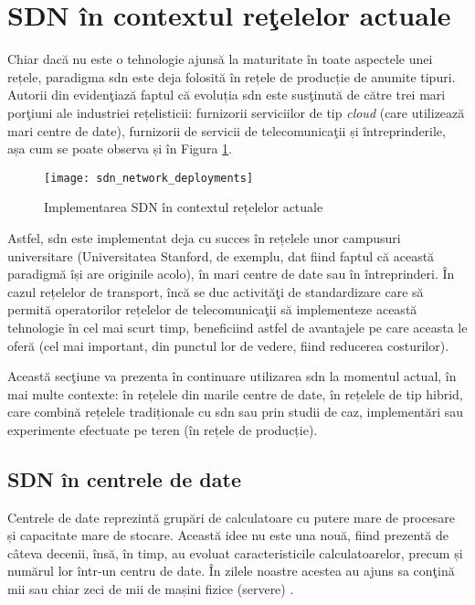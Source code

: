 \section{SDN în contextul reţelelor actuale}

Chiar dacă nu este o tehnologie ajunsă la maturitate în toate aspectele unei rețele, paradigma \gls{sdn} este deja folosită în rețele de producție de anumite tipuri. Autorii din \cite{alvizu2017comprehensive} evidenţiază faptul că evoluția \gls{sdn} este susţinută de către trei mari porţiuni ale industriei rețelisticii: furnizorii serviciilor de tip \textit{cloud} (care utilizează mari centre de date), furnizorii de servicii de telecomunicaţii și întreprinderile, așa cum se poate observa și în Figura \ref{fig:sdn_network_deployments}. 

\begin{figure}[h]
	\centering
	\texttt{[image: sdn\_network\_deployments]}
	\caption{Implementarea SDN în contextul rețelelor actuale~\cite{alvizu2017comprehensive}}
	\label{fig:sdn_network_deployments}
\end{figure}

Astfel, \gls{sdn} este implementat deja cu succes în rețelele unor campusuri universitare (Universitatea Stanford, de exemplu, dat fiind faptul că această paradigmă își are originile acolo), în mari centre de date sau în întreprinderi. În cazul rețelelor de transport, încă se duc activităţi de standardizare care să permită operatorilor rețelelor de telecomunicaţii să implementeze această tehnologie în cel mai scurt timp, beneficiind astfel de avantajele pe care aceasta le oferă (cel mai important, din punctul lor de vedere, fiind reducerea costurilor).

Această secţiune va prezenta în continuare utilizarea \gls{sdn} la momentul actual, în mai multe contexte: în rețelele din marile centre de date, în rețelele de tip hibrid, care combină rețelele tradiționale cu \gls{sdn} sau prin studii de caz, implementări sau experimente efectuate pe teren (în rețele de producție).

\subsection{SDN în centrele de date}

Centrele de date reprezintă grupări de calculatoare cu putere mare de procesare și capacitate mare de stocare. Această idee nu este una nouă, fiind prezentă de câteva decenii, însă, în timp, au evoluat caracteristicile calculatoarelor, precum și numărul lor într-un centru de date. În zilele noastre acestea au ajuns sa conţină mii sau chiar zeci de mii de mașini fizice (servere) \cite{goransson2016software}.

